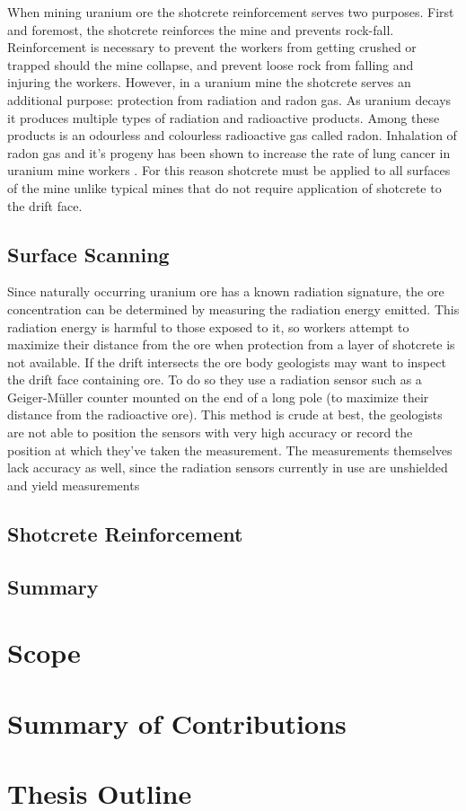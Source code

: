 When mining uranium ore the shotcrete reinforcement serves two purposes. First and foremost, the shotcrete reinforces the mine and prevents rock-fall. Reinforcement is necessary to prevent the workers from getting crushed or trapped should the mine collapse, and prevent loose rock from falling and injuring the workers. However, in a uranium mine the shotcrete serves an additional purpose: protection from radiation and radon gas. As uranium decays it produces multiple types of radiation and radioactive products. Among these products is an odourless and colourless radioactive gas called radon. Inhalation of radon gas and it's progeny has been shown to increase the rate of lung cancer in uranium mine workers \cite{radon}. For this reason shotcrete must be applied to all surfaces of the mine unlike typical mines that do not require application of shotcrete to the drift face.\\

\subsection{Surface Scanning}

Since naturally occurring uranium ore has a known radiation signature, the ore concentration can be determined by measuring the radiation energy emitted. This radiation energy is harmful to those exposed to it, so workers attempt to maximize their distance from the ore when protection from a layer of shotcrete is not available. If the drift intersects the ore body geologists may want to inspect the drift face containing ore. To do so they use a radiation sensor such as a Geiger-M{\"u}ller counter mounted on the end of a long pole (to maximize their distance from the radioactive ore). This method is crude at best, the geologists are not able to position the sensors with very high accuracy or record the position at which they've taken the measurement. The measurements themselves lack accuracy as well, since the radiation sensors currently in use are unshielded and yield measurements 


\subsection{Shotcrete Reinforcement}
\subsection{Summary}
\section{Scope}
\label{sec:scope}
\section{Summary of Contributions}
\label{sec:contributions}
\section{Thesis Outline}
\label{sec:outline}